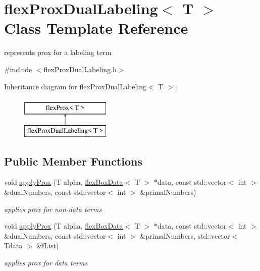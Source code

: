 \hypertarget{classflex_prox_dual_labeling}{}\section{flex\+Prox\+Dual\+Labeling$<$ T $>$ Class Template Reference}
\label{classflex_prox_dual_labeling}


represents prox for a labeling term  




{\ttfamily \#include $<$flex\+Prox\+Dual\+Labeling.\+h$>$}

Inheritance diagram for flex\+Prox\+Dual\+Labeling$<$ T $>$\+:\begin{figure}[H]
\begin{center}
\leavevmode
\includegraphics[height=2.000000cm]{classflex_prox_dual_labeling}
\end{center}
\end{figure}
\subsection*{Public Member Functions}
\begin{DoxyCompactItemize}
\item 
void \hyperlink{classflex_prox_dual_labeling_a29e89f413ea586b9390da273141c823b}{apply\+Prox} (T alpha, \hyperlink{classflex_box_data}{flex\+Box\+Data}$<$ T $>$ $\ast$data, const std\+::vector$<$ int $>$ \&dual\+Numbers, const std\+::vector$<$ int $>$ \&primal\+Numbers)
\begin{DoxyCompactList}\small\item\em applies prox for non-\/data terms \end{DoxyCompactList}\item 
void \hyperlink{classflex_prox_dual_labeling_a224460146ef61af8b939e4a961cbe776}{apply\+Prox} (T alpha, \hyperlink{classflex_box_data}{flex\+Box\+Data}$<$ T $>$ $\ast$data, const std\+::vector$<$ int $>$ \&dual\+Numbers, const std\+::vector$<$ int $>$ \&primal\+Numbers, std\+::vector$<$ Tdata $>$ \&f\+List)
\begin{DoxyCompactList}\small\item\em applies prox for data terms \end{DoxyCompactList}\end{DoxyCompactItemize}
